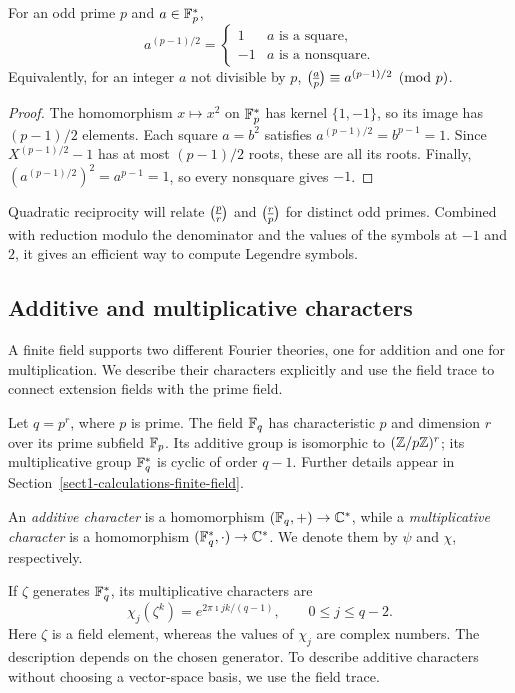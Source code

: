 \begin{lem}
\label{lem-formula-euler}
For an odd prime $p$ and $a\in\mathbb{F}_p^*$,
\[
 a^{(p-1)/2}=\begin{cases}1&a\text{ is a square},\\-1&a\text{ is a nonsquare}.
 \end{cases}
\]
Equivalently, for an integer $a$ not divisible by $p$,
$\legsymb ap\equiv a^{(p-1)/2}\pmod p$.
\end{lem}
\begin{proof}
The homomorphism $x\mapsto x^2$ on $\mathbb{F}_p^*$ has kernel $\{1,-1\}$,
so its image has $(p-1)/2$ elements. Each square $a=b^2$ satisfies
$a^{(p-1)/2}=b^{p-1}=1$. Since $X^{(p-1)/2}-1$ has at most $(p-1)/2$
roots, these are all its roots. Finally,
$(a^{(p-1)/2})^2=a^{p-1}=1$, so every nonsquare gives $-1$.
\end{proof}
Quadratic reciprocity will relate $\legsymb pr$ and $\legsymb rp$ for distinct
odd primes. Combined with reduction modulo the denominator and the values
of the symbols at $-1$ and $2$, it gives an efficient way to compute
Legendre symbols.

\subsection{Additive and multiplicative characters}

A finite field supports two different Fourier theories, one for addition and
one for multiplication. We describe their characters explicitly and use the
field trace to connect extension fields with the prime field.

Let $q=p^r$, where $p$ is prime. The field $\mathbb{F}_q$ has characteristic $p$
and dimension $r$ over its prime subfield $\mathbb{F}_p$. Its additive group is
isomorphic to $(\mathbb{Z}/p\mathbb{Z})^r$; its multiplicative group $\mathbb{F}_q^*$ is cyclic
of order $q-1$. Further details appear in
Section~\ref{sect1-calculations-finite-field}.


\begin{defn}
An \emph{additive character} is a homomorphism
$(\mathbb{F}_q,+)\to\mathbb{C}^*$, while a \emph{multiplicative character} is a homomorphism
$(\mathbb{F}_q^*,\cdot)\to\mathbb{C}^*$. We denote them by $\psi$ and $\chi$, respectively.
\end{defn}
If $\zeta$ generates $\mathbb{F}_q^*$, its multiplicative characters are
\[
 \chi_j(\zeta^k)=e^{2\pi\imath jk/(q-1)},\qquad 0\leq j\leq q-2.
\]
Here $\zeta$ is a field element, whereas the values of $\chi_j$ are complex
numbers. The description depends on the chosen generator.
To describe additive characters without choosing a vector-space basis,
we use the field trace.

